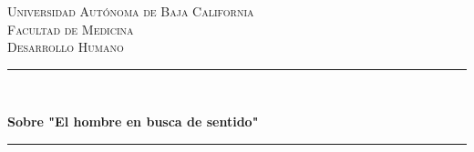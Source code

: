 \documentclass[12pt, letterpaper]{article}
\begin{document}

\begin{titlepage} %
	\vspace*{-3cm}
	\hspace*{-2.5cm}
	\newcommand{\HRule}{\rule{\linewidth}{0.5mm}} %
	\center %
	
	
	\textsc{\Large Universidad Autónoma de Baja California}\\[1.5cm] %
	
	\textsc{\Large Facultad de Medicina}\\[0.5cm] %
	
	\textsc{\large Desarrollo Humano}\\[0.5cm] %
	
	
	\HRule\\[0.4cm]
	
	{\huge\bfseries Sobre "El hombre en busca de sentido"\\[0.4cm] %
	
	\HRule\\[1.5cm]
	
	
}
\end{titlepage}
\end{document}
